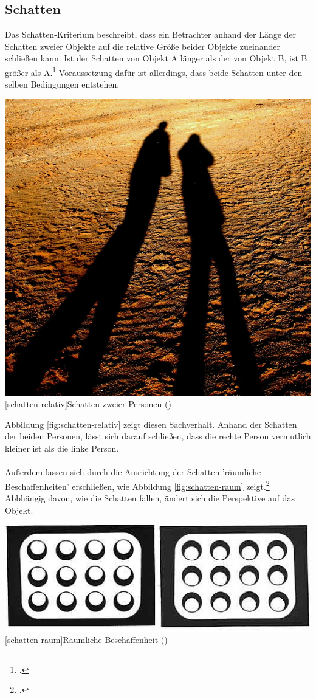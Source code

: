 \subsection{Schatten}
Das Schatten-Kriterium beschreibt, dass ein Betrachter anhand der Länge der Schatten zweier Objekte auf die relative Größe beider Objekte zueinander schließen kann. Ist der Schatten von Objekt A länger als der von Objekt B, ist B größer als A.\footcite[Vgl.][S.43]{Gras16} Voraussetzung dafür ist allerdings, dass beide Schatten unter den selben Bedingungen entstehen.\\

\vspace{1em}
\begin{minipage}{\linewidth}
	\centering
	\includegraphics[width=0.7\linewidth]{images/schatten_personen.jpg}
	[schatten-relativ]{Schatten zweier Personen (\cite{PixaXX})}
	\label{fig:schatten-relativ}
\end{minipage}
\vspace{1em} 

Abbildung \ref{fig:schatten-relativ} zeigt diesen Sachverhalt. Anhand der Schatten der beiden Personen, lässt sich darauf schließen, dass die rechte Person vermutlich kleiner ist als die linke Person.\\
\\
Außerdem lassen sich durch die Ausrichtung der Schatten  'räumliche Beschaffenheiten' erschließen, wie Abbildung \ref{fig:schatten-raum} zeigt.\footcite[Vgl.]{heidXX} Abbhängig davon, wie die Schatten fallen, ändert sich die Perspektive auf das Objekt.

\vspace{1em}
\begin{minipage}{\linewidth}
	\centering
	\includegraphics[width=0.7\linewidth]{images/schatten01.jpg}
	[schatten-raum]{Räumliche Beschaffenheit (\cite{heidXX})}
	\label{fig:schatten-raum}
\end{minipage}
\vspace{1em}

